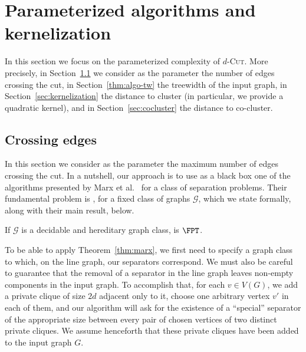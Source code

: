 \section{Parameterized algorithms and kernelization}
\label{sec:param}

In this section we focus on the parameterized complexity of \textsc{$d$-Cut}. More precisely, in Section~\ref{sec:crossing-edges} we consider as the parameter the number of edges crossing the cut, in Section~\ref{thm:algo-tw} the treewidth of the input graph, in Section~\ref{sec:kernelization} the distance to cluster (in particular, we provide a quadratic kernel), and in Section~\ref{sec:cocluster} the distance to co-cluster.


\subsection{Crossing edges}
\label{sec:crossing-edges}


In this section we consider as the parameter the maximum number of edges crossing the cut. In a nutshell, our approach is to use as a black box one of the algorithms presented by Marx et al.~\cite{marx_treewidth_reduction} for a class of separation problems. Their fundamental problem is , for a fixed class of graphs $\mathcal{G}$, which we state formally, along with their main result, below.



\begin{theorem}
    \label{thm:marx}
    If $\mathcal{G}$ is a decidable and hereditary graph class,  is $\FPT$.
\end{theorem}

To be able to apply Theorem~\ref{thm:marx}, we first need to specify a graph class to which, on the line graph, our separators correspond. We must also be careful to guarantee that the removal of a separator in the line graph leaves non-empty components in the input graph. To accomplish that, for each $v \in V(G)$, we add a private clique of size $2d$ adjacent only to it, choose one arbitrary vertex $v'$ in each of them, and our algorithm will ask for the existence of a ``special'' separator of the appropriate size between every pair of chosen vertices of two distinct private cliques. We assume henceforth that these private cliques have been added to the input graph $G$.

